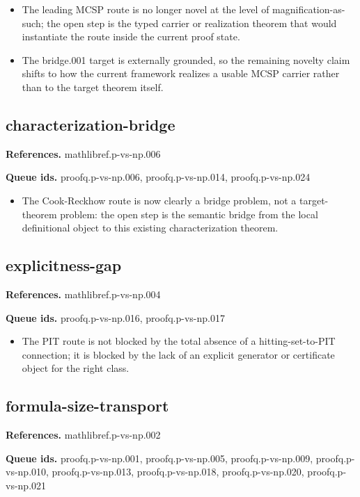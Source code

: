 \documentclass[11pt]{article}
\begin{document}
\begin{itemize}[leftmargin=*,itemsep=0.2em]
\item The leading MCSP route is no longer novel at the level of magnification-as-such; the open step is the typed carrier or realization theorem that would instantiate the route inside the current proof state.
\item The bridge.001 target is externally grounded, so the remaining novelty claim shifts to how the current framework realizes a usable MCSP carrier rather than to the target theorem itself.
\end{itemize}
\subsection*{characterization-bridge}
\textbf{References.} mathlibref.p-vs-np.006

\textbf{Queue ids.} proofq.p-vs-np.006, proofq.p-vs-np.014, proofq.p-vs-np.024

\begin{itemize}[leftmargin=*,itemsep=0.2em]
\item The Cook-Reckhow route is now clearly a bridge problem, not a target-theorem problem: the open step is the semantic bridge from the local definitional object to this existing characterization theorem.
\end{itemize}
\subsection*{explicitness-gap}
\textbf{References.} mathlibref.p-vs-np.004

\textbf{Queue ids.} proofq.p-vs-np.016, proofq.p-vs-np.017

\begin{itemize}[leftmargin=*,itemsep=0.2em]
\item The PIT route is not blocked by the total absence of a hitting-set-to-PIT connection; it is blocked by the lack of an explicit generator or certificate object for the right class.
\end{itemize}
\subsection*{formula-size-transport}
\textbf{References.} mathlibref.p-vs-np.002

\textbf{Queue ids.} proofq.p-vs-np.001, proofq.p-vs-np.005, proofq.p-vs-np.009, proofq.p-vs-np.010, proofq.p-vs-np.013, proofq.p-vs-np.018, proofq.p-vs-np.020, proofq.p-vs-np.021
\end{document}
